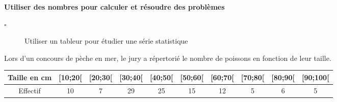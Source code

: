 \begin{titreTice}

\end{titreTice}



\begin{CpsCol}
\textbf{Utiliser des nombres pour calculer et résoudre des problèmes}
\begin{description}
\item[$\square$] Utiliser un tableur pour étudier une série statistique
\end{description}
\end{CpsCol}

Lors d'un concours de pèche en mer, le jury a répertorié le nombre de poissons en fonction de leur taille.

\begin{tabular}{|c|c|c|c|c|c|c|c|c|c|}
\hline  
Taille en cm& [10;20[& [20;30[& [30;40[ &[40;50[ &[50;60[& [60;70[& [70;80[& [80;90[& [90;100[\\ 
\hline  
Effectif &10 &7& 29& 25& 15& 12& 5& 6 &5\\ 
\hline 
\end{tabular}

